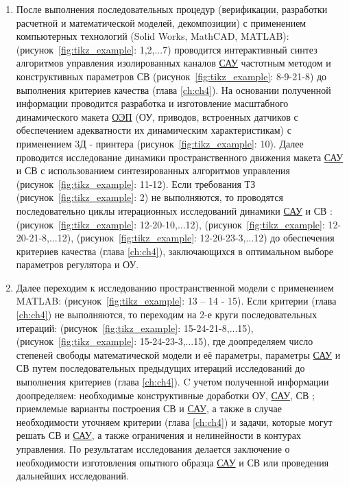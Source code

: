 \begin{enumerate}
	\item После выполнения последовательных процедур (верификации, разработки расчетной и математической моделей, декомпозиции) с применением компьютерных технологий (Solid Works, MathCAD, MATLAB): (рисунок~\ref{fig:tikz_example}: 1,2,...7) проводится интерактивный синтез алгоритмов управления изолированных каналов \hyperref[acroSAU]{САУ} частотным методом \cite[]{Bessekerski20} и конструктивных параметров СВ (рисунок~\ref{fig:tikz_example}: 8-9-21-8) до выполнения критериев качества (глава \ref{ch:ch4}). На основании полученной информации проводится разработка и изготовление масштабного динамического макета \hyperref[acroEOS]{ОЭП} (ОУ, приводов, встроенных датчиков с обеспечением адекватности их динамическим характеристикам) с применением 3Д - принтера (рисунок~\ref{fig:tikz_example}: 10). Далее проводится исследование динамики пространственного движения макета \hyperref[acroSAU]{САУ} и СВ с использованием синтезированных алгоритмов управления (рисунок~\ref{fig:tikz_example}: 11-12). Если требования ТЗ (рисунок~\ref{fig:tikz_example}: 2) не выполняются, то проводятся последовательно циклы итерационных исследований динамики \hyperref[acroSAU]{САУ} и СВ : (рисунок~\ref{fig:tikz_example}: 12-20-10,...12), (рисунок~\ref{fig:tikz_example}: 12-20-21-8,...12), (рисунок~\ref{fig:tikz_example}: 12-20-23-3,...12) до обеспечения критериев качества (глава \ref{ch:ch4}), заключающихся в оптимальном выборе параметров регулятора и ОУ.
	\item Далее переходим к исследованию пространственной модели с применением MATLAB: 
	(рисунок~\ref{fig:tikz_example}: 13 – 14 - 15). Если критерии (глава \ref{ch:ch4}) не выполняются, то переходим на 2-е круги последовательных итераций: (рисунок~\ref{fig:tikz_example}: 15-24-21-8,...15), (рисунок~\ref{fig:tikz_example}: 15-24-23-3,...15), где доопределяем число степеней свободы математической модели и её параметры, параметры \hyperref[acroSAU]{САУ} и СВ путем последовательных предыдущих итераций исследований до выполнения критериев (глава \ref{ch:ch4}). C учетом полученной информации доопределяем: необходимые конструктивные доработки  ОУ, \hyperref[acroSAU]{САУ}, СВ ; приемлемые варианты построения СВ и \hyperref[acroSAU]{САУ}, а также в случае необходимости уточняем критерии (глава \ref{ch:ch4}) и задачи, которые могут решать СВ и \hyperref[acroSAU]{САУ}, а также ограничения и нелинейности в контурах управления. По результатам исследования делается заключение о необходимости изготовления опытного образца \hyperref[acroSAU]{САУ} и СВ или проведения дальнейших исследований.
	

\end{enumerate}

